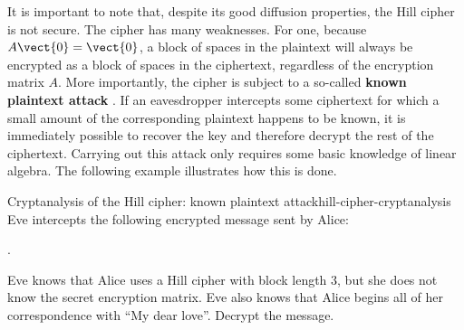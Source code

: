 It is important to note that, despite its good diffusion properties,
the Hill cipher is not secure. The cipher has many weaknesses. For
one, because $A\vect{0}=\vect{0}$, a block of spaces in the plaintext
will always be encrypted as a block of spaces in the ciphertext,
regardless of the encryption matrix $A$. More importantly, the cipher
is subject to a so-called \textbf{known plaintext attack}%
%
.  If an eavesdropper intercepts
some ciphertext for which a small amount of the corresponding
plaintext happens to be known, it is immediately possible to recover
the key and therefore decrypt the rest of the ciphertext. Carrying out
this attack only requires some basic knowledge of linear algebra. The
following example illustrates how this is done.

\begin{example}{Cryptanalysis of the Hill cipher: known plaintext attack}{hill-cipher-cryptanalysis}
  Eve intercepts the following encrypted message sent by Alice:%
  \begin{center}
    .
  \end{center}
  Eve knows that Alice uses a Hill cipher with block length 3, but she
  does not know the secret encryption matrix. Eve also knows that
  Alice begins all of her correspondence with ``My dear
  love''. Decrypt the message.
\end{example}


